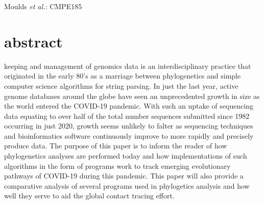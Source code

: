 \documentclass[12pt,journal,compsoc]{IEEEtran}
\date{\today}
\begin{document}


%
{Moulds \MakeLowercase{\textit{et al.}}: CMPE185}






\section{abstract}
 keeping and management of genomics  data is an interdisciplinary practice that originated  in  the  early  80’s  as  a marriage between  phylogenetics and simple  computer science algorithms for string parsing. In just the last year, active genome databases around the globe have seen an unprecedented growth in size as the world entered the COVID-19 pandemic. With such an  uptake  of sequencing data equating to over half of the total number sequences submitted since 1982 occurring in just 2020,  growth seems unlikely to falter  as sequencing techniques and bioinformatics software continuously improve to more rapidly and precisely produce data. The purpose of this paper is to inform the reader of how phylogenetics analyses are performed today and how implementations of such algorithms in the form of programs work to track emerging evolutionary pathways of COVID-19 during this pandemic. This paper will also provide a comparative analysis of several programs used in phylogetics analysis and how well they serve to aid the global contact tracing effort. 
\end{document}
